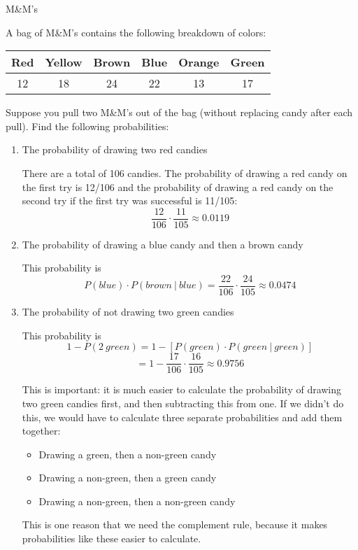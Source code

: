 \begin{example}[https://www.youtube.com/watch?v=7Xe9xjXlC3A]{M\&M's}

A bag of M\&M's contains the following breakdown of colors:

\begin{center}
\begin{tabular}{|c|c|c|c|c|c|} \hline
Red & Yellow &  Brown & Blue  & Orange & Green \\ \hline
12 & 18 & 24 &  22 &  13 & 17 \\ \hline
\end{tabular}
\end{center}
Suppose you pull two M\&M's out of the bag (without replacing candy after each pull). Find the following probabilities:

\begin{enumerate}
\item The probability of drawing two red candies
\begin{center}
There are a total of 106 candies.  The probability of drawing a red candy on the first try is 12/106 and the probability of drawing a red candy on the second try if the first try was successful is 11/105:
\[\frac{12}{106} \cdot \frac{11}{105} \approx 0.0119\]
\end{center}

\item The probability of drawing a blue candy and then a brown candy
\begin{center}
This probability is
\[P(blue) \cdot P(brown \ | \ blue) = \frac{22}{106} \cdot \frac{24}{105} \approx 0.0474\]
\end{center}

\item The probability of not drawing two green candies
\begin{center}
This probability is
\[1-P(2 \ green) = 1-\left[P(green) \cdot P(green \ | \ green)\right]\]
\[=1-\frac{17}{106} \cdot \frac{16}{105} \approx 0.9756\]
\end{center}
This is important: it is much easier to calculate the probability of drawing two green candies first, and then subtracting this from one.  If we didn't do this, we would have to calculate three separate probabilities and add them together:
\begin{itemize}
\item Drawing a green, then a non-green candy
\item Drawing a non-green, then a green candy
\item Drawing a non-green, then a non-green candy
\end{itemize}
This is one reason that we need the complement rule, because it makes probabilities like these easier to calculate.
\end{enumerate}
\end{example}
\vfill
\pagebreak

